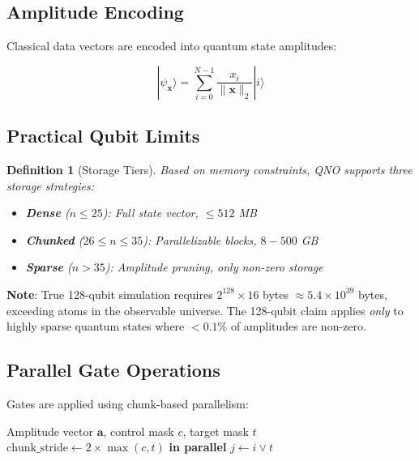 \documentclass[11pt,a4paper]{article}
\newtheorem{definition}[theorem]{Definition}
\begin{document}
\subsection{Amplitude Encoding}

Classical data vectors are encoded into quantum state amplitudes:

\begin{equation}
|\psi_{\mathbf{x}}\rangle = \sum_{i=0}^{N-1} \frac{x_i}{\|\mathbf{x}\|_2} |i\rangle
\end{equation}

\subsection{Practical Qubit Limits}

\begin{definition}[Storage Tiers]
Based on memory constraints, QNO supports three storage strategies:
\begin{itemize}
    \item \textbf{Dense} ($n \leq 25$): Full state vector, $\leq 512$ MB
    \item \textbf{Chunked} ($26 \leq n \leq 35$): Parallelizable blocks, $8-500$ GB
    \item \textbf{Sparse} ($n > 35$): Amplitude pruning, only non-zero storage
\end{itemize}
\end{definition}

\textbf{Note}: True 128-qubit simulation requires $2^{128} \times 16$ bytes $\approx 5.4 \times 10^{39}$ bytes, exceeding atoms in the observable universe. The 128-qubit claim applies \textit{only} to highly sparse quantum states where $<0.1\%$ of amplitudes are non-zero.

\subsection{Parallel Gate Operations}

Gates are applied using chunk-based parallelism:

\begin{algorithm}
\caption{Parallel CNOT Gate Application}
\begin{algorithmic}[1]
\Require Amplitude vector $\mathbf{a}$, control mask $c$, target mask $t$
\State $\text{chunk\_stride} \gets 2 \times \max(c, t)$
 \textbf{in parallel}
            \State $j \gets i \lor t$
            \State {}
        \EndIf
    \EndFor
\EndFor
\end{algorithmic}
\end{algorithm}
\end{document}
